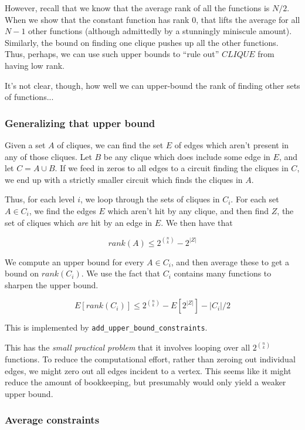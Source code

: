 \documentclass[12pt]{article}
\theoremstyle{definition}
\begin{document}
However, recall that we know that the average rank of all the functions
is $N/2$.
When we show that the constant function has rank 0, that lifts
the average for all $N-1$ other functions (although admittedly
by a stunningly miniscule amount).
Similarly, the bound on finding one clique pushes up all the other functions.
Thus, perhaps, we can use such upper bounds to ``rule out'' $CLIQUE$ from
having low rank.

It's not clear, though, how well we can upper-bound the rank
of finding other sets of functions...

\subsubsection{Generalizing that upper bound}

Given a set $A$ of cliques, we
can find the set $E$ of edges which aren't present in any of those cliques.
Let $B$ be any clique which does include some edge in $E$, and let
$C = A \cup B$. If we feed in zeros to all edges to a circuit
finding the cliques in $C$, we end up with a strictly smaller circuit 
which finds the cliques in $A$.

Thus, for each level $i$, we loop through the sets of cliques in $C_i$.
For each set $A \in C_i$, we find the edges $E$ which aren't hit by any clique, and then
find $Z$, the set of cliques which {\em are} hit by an edge in $E$.
We then have that 

\[
rank(A) \le 2^{n \choose k} - 2^{|Z|}
\]

We compute an upper bound for every $A \in C_i$, and then average these
to get a bound on $rank(C_i)$. We use the fact that $C_i$ contains many
functions to sharpen the upper bound.

\[
E[rank(C_i)] \le 2^{n \choose k} - E[2^{|Z|}] - |C_i|/2
\]

This is implemented by {\tt add\_upper\_bound\_constraints}.

This has the {\em small practical problem} that it involves
looping over all $2^{n \choose k}$ functions. To reduce the computational
effort, rather than zeroing out individual edges,
we might zero out all edges incident to a vertex. This seems like it might reduce
the amount of bookkeeping, but presumably would only yield a weaker upper bound.

\subsubsection{Average constraints}
\end{document}
